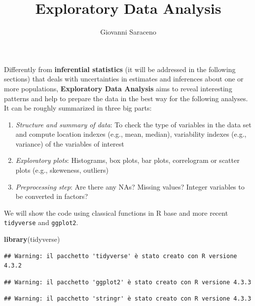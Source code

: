 \documentclass[
]{article}
\title{Exploratory Data Analysis}
\author{Giovanni Saraceno}
\date{}
\newenvironment{Shaded}{\begin{snugshade}}{\end{snugshade}}
\newcommand{\FunctionTok}[1]{\textcolor[rgb]{0.13,0.29,0.53}{\textbf{#1}}}
\newcommand{\NormalTok}[1]{#1}
\providecommand{\tightlist}{%
  \setlength{\itemsep}{0pt}\setlength{\parskip}{0pt}}
\begin{document}
\maketitle

{
\setcounter{tocdepth}{2}
\tableofcontents
}
Differently from \textbf{inferential statistics} (it will be addressed
in the following sections) that deals with uncertainties in estimates
and inferences about one or more populations, \textbf{Exploratory Data
Analysis} aims to reveal interesting patterns and help to prepare the
data in the best way for the following analyses.\\
It can be roughly summarized in three big parts:

\begin{enumerate}
\def\labelenumi{\arabic{enumi}.}
\tightlist
\item
  \emph{Structure and summary of data}: To check the type of variables
  in the data set and compute location indexes (e.g., mean, median),
  variability indexes (e.g., variance) of the variables of interest
\item
  \emph{Exploratory plots}: Histograms, box plots, bar plots,
  correlogram or scatter plots (e.g., skeweness, outliers)
\item
  \emph{Preprocessing step}: Are there any NAs? Missing values? Integer
  variables to be converted in factors?
\end{enumerate}

We will show the code using classical functions in R base and more
recent \texttt{tidyverse} and \texttt{ggplot2}.

\begin{Shaded}
\begin{Highlighting}[]
\FunctionTok{library}\NormalTok{(tidyverse)}
\end{Highlighting}
\end{Shaded}

\begin{verbatim}
## Warning: il pacchetto 'tidyverse' è stato creato con R versione 4.3.2
\end{verbatim}

\begin{verbatim}
## Warning: il pacchetto 'ggplot2' è stato creato con R versione 4.3.3
\end{verbatim}

\begin{verbatim}
## Warning: il pacchetto 'stringr' è stato creato con R versione 4.3.3
\end{verbatim}
\end{document}

